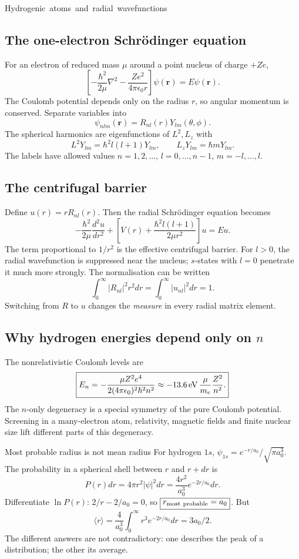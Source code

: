 \unit{Hydrogenic atoms and radial wavefunctions}
\subsection{The one-electron Schr\"odinger equation}
For an electron of reduced mass \(\mu\)
around a point nucleus of charge \(+Ze\),
\[
\left[-\frac{\hbar^2}{2\mu}\nabla^2
-\frac{Ze^2}{4\pi\epsilon_0r}\right]
\psi(\mathbf r)=E\psi(\mathbf r).
\]
The Coulomb potential depends only on
the radius \(r\), so angular momentum is
conserved. Separate variables into
\[
\boxed{\psi_{nlm}(\mathbf r)=R_{nl}(r)
Y_{lm}(\theta,\phi).}
\]
The spherical harmonics are eigenfunctions
of \(L^2,L_z\) with
\[
L^2Y_{lm}=\hbar^2l(l+1)Y_{lm},\qquad
L_zY_{lm}=\hbar mY_{lm}.
\]
The labels have allowed values
\(n=1,2,\ldots\), \(l=0,\ldots,n-1\),
\(m=-l,\ldots,l\).

\subsection{The centrifugal barrier}
Define \(u(r)=rR_{nl}(r)\).
Then the radial Schr\"odinger equation becomes
\[
\boxed{-\frac{\hbar^2}{2\mu}\frac{d^2u}{dr^2}
+\left[V(r)+\frac{\hbar^2l(l+1)}{2\mu r^2}\right]u
=Eu.}
\]
The term proportional to \(1/r^2\)
is the effective centrifugal barrier.
For \(l>0\), the radial wavefunction
is suppressed near the nucleus;
\(s\)-states with \(l=0\) penetrate it
much more strongly.
The normalisation can be written
\[
\int_0^\infty|R_{nl}|^2r^2dr
=\int_0^\infty|u_{nl}|^2dr=1.
\]
Switching from \(R\) to \(u\) changes the
\emph{measure} in every radial matrix element.

\subsection{Why hydrogen energies depend only on \(n\)}
The nonrelativistic Coulomb levels are
\[
\boxed{E_n=-\frac{\mu Z^2e^4}
{2(4\pi\epsilon_0)^2\hbar^2n^2}
\approx-13.6\,{\rm eV}\,
\frac{\mu}{m_e}\frac{Z^2}{n^2}.}
\]
The \(n\)-only degeneracy is a special
symmetry of the pure Coulomb potential.
Screening in a many-electron atom,
relativity, magnetic fields and finite
nuclear size lift different parts
of this degeneracy.

\begin{worked}{Most probable radius is not mean radius}
For hydrogen \(1s\),
\(\psi_{1s}=e^{-r/a_0}/\sqrt{\pi a_0^3}\).
The probability in a spherical shell
between \(r\) and \(r+dr\) is
\[
P(r)dr=4\pi r^2|\psi|^2dr
=\frac{4r^2}{a_0^3}e^{-2r/a_0}dr.
\]
Differentiate \(\ln P(r)\):
\(2/r-2/a_0=0\), so
\(\boxed{r_{\rm most\ probable}=a_0}\).
But
\[
\langle r\rangle=\frac4{a_0^3}
\int_0^\infty r^3e^{-2r/a_0}dr
=\boxed{3a_0/2}.
\]
The different answers are not contradictory:
one describes the peak of a distribution;
the other its average.
\end{worked}

